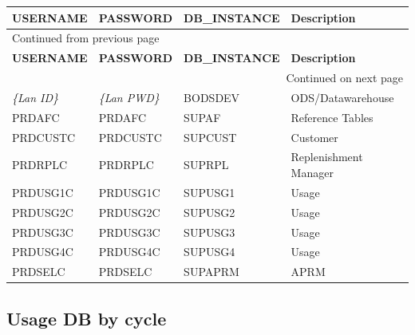 \documentclass[12pt,twoside]{article}
\begin{document}
\begin{longtable}{l|l|l|l}
\hline
\textbf{USERNAME} & \textbf{PASSWORD} & \textbf{DB\_INSTANCE} & \textbf{Description}\\
\hline
\endfirsthead
\multicolumn{4}{l}{Continued from previous page} \\
\hline

\textbf{USERNAME} & \textbf{PASSWORD} & \textbf{DB\_INSTANCE} & \textbf{Description} \\

\hline
\endhead
\hline\multicolumn{4}{r}{Continued on next page} \\
\endfoot
\endlastfoot
\hline
\emph{\{Lan ID\}} & \emph{\{Lan PWD\}} & BODSDEV & ODS/Datawarehouse\\
PRDAFC & PRDAFC & SUPAF & Reference Tables\\
PRDCUSTC & PRDCUSTC & SUPCUST & Customer\\
PRDRPLC & PRDRPLC & SUPRPL & Replenishment Manager\\
PRDUSG1C & PRDUSG1C & SUPUSG1 & Usage\\
PRDUSG2C & PRDUSG2C & SUPUSG2 & Usage\\
PRDUSG3C & PRDUSG3C & SUPUSG3 & Usage\\
PRDUSG4C & PRDUSG4C & SUPUSG4 & Usage\\
PRDSELC & PRDSELC & SUPAPRM & APRM\\
\hline
\end{longtable}
\normalsize
\subsection{Usage DB by cycle}
\label{sec:orgheadline66}
\footnotesize
\end{document}
